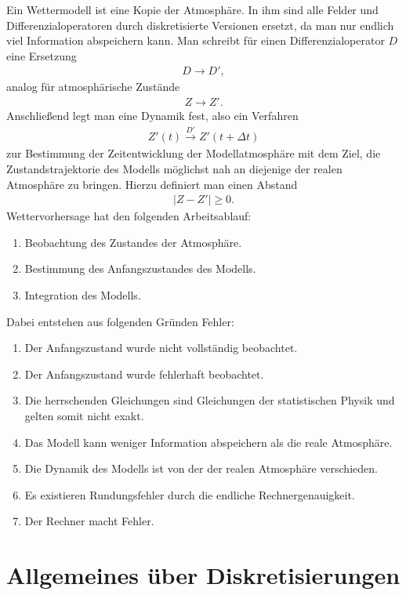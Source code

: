 \documentclass{book}
\begin{document}
Ein Wettermodell ist eine Kopie der Atmosphäre. In ihm sind alle Felder und Differenzialoperatoren durch diskretisierte Versionen ersetzt, da man nur endlich viel Information abspeichern kann. Man schreibt für einen Differenzialoperator $D$ eine Ersetzung
%
\begin{eqnarray}
D\to D', 
\end{eqnarray}
%
analog für atmosphärische Zustände
%
\begin{eqnarray}
Z\to Z'.
\end{eqnarray}
%
Anschließend legt man eine Dynamik fest, also ein Verfahren
%
\begin{eqnarray}
Z'\left(t\right)\stackrel{D'}{\to}Z'\left(t + \Delta t\right)
\end{eqnarray}
%
zur Bestimmung der Zeitentwicklung der Modellatmosphäre mit dem Ziel, die Zustandstrajektorie des Modells möglichst nah an diejenige der realen Atmosphäre zu bringen. Hierzu definiert man einen Abstand
%
\begin{eqnarray}
\left|Z - Z'\right|\geq 0.
\end{eqnarray}
%
Wettervorhersage hat den folgenden Arbeitsablauf:
%
\begin{enumerate}
\item Beobachtung des Zustandes der Atmosphäre.
\item Bestimmung des Anfangszustandes des Modells.
\item Integration des Modells.
\end{enumerate}
%
Dabei entstehen aus folgenden Gründen Fehler:
%
\begin{enumerate}
\item Der Anfangszustand wurde nicht vollständig beobachtet.
\item Der Anfangszustand wurde fehlerhaft beobachtet.
\item Die herrschenden Gleichungen sind Gleichungen der statistischen Physik und gelten somit nicht exakt.
\item Das Modell kann weniger Information abspeichern als die reale Atmosphäre.
\item Die Dynamik des Modells ist von der der realen Atmosphäre verschieden.
\item Es existieren Rundungsfehler durch die endliche Rechnergenauigkeit.
\item Der Rechner macht Fehler.
\end{enumerate}
%
\section{Allgemeines über Diskretisierungen}
\label{sec:allgemeines_ueber_diskretisierungen}
\end{document}
